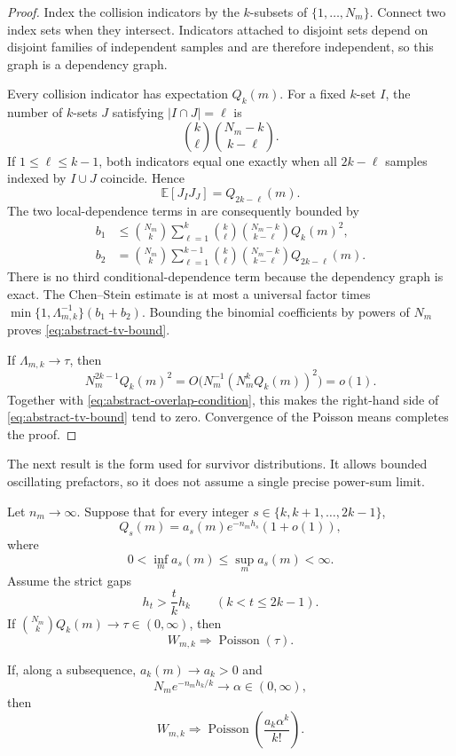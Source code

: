 \begin{proof}
Index the collision indicators by the \(k\)-subsets of
\(\{1,\ldots,N_m\}\).  Connect two index sets when they intersect.
Indicators attached to disjoint sets depend on disjoint families of
independent samples and are therefore independent, so this graph is a
dependency graph.

Every collision indicator has expectation \(Q_k(m)\).  For a fixed
\(k\)-set \(I\), the number of \(k\)-sets \(J\) satisfying
\(|I\cap J|=\ell\) is
\[
  \binom{k}{\ell}\binom{N_m-k}{k-\ell}.
\]
If \(1\leq\ell\leq k-1\), both indicators equal one exactly when all
\(2k-\ell\) samples indexed by \(I\cup J\) coincide.  Hence
\[
  \mathbb E[J_IJ_J]=Q_{2k-\ell}(m).
\]
The two local-dependence terms in
\citet[Theorem~1]{ArratiaGoldsteinGordon1989} are consequently bounded
by
\begin{align*}
 b_1
 &\leq\binom{N_m}{k}
   \sum_{\ell=1}^k
   \binom{k}{\ell}\binom{N_m-k}{k-\ell}Q_k(m)^2,\\
 b_2
 &=\binom{N_m}{k}
   \sum_{\ell=1}^{k-1}
   \binom{k}{\ell}\binom{N_m-k}{k-\ell}
   Q_{2k-\ell}(m).
\end{align*}
There is no third conditional-dependence term because the dependency
graph is exact.  The Chen--Stein estimate is at most a universal factor
times \(\min\{1,\Lambda_{m,k}^{-1}\}(b_1+b_2)\).  Bounding the
binomial coefficients by powers of \(N_m\) proves
\eqref{eq:abstract-tv-bound}.

If \(\Lambda_{m,k}\to\tau\), then
\[
  N_m^{2k-1}Q_k(m)^2
  =O\bigl(N_m^{-1}(N_m^kQ_k(m))^2\bigr)=o(1).
\]
Together with \eqref{eq:abstract-overlap-condition}, this makes the
right-hand side of \eqref{eq:abstract-tv-bound} tend to zero.
Convergence of the Poisson means completes the proof.
\end{proof}

The next result is the form used for survivor distributions.  It allows
bounded oscillating prefactors, so it does not assume a single precise
power-sum limit.

\begin{corollary}
\label{cor:abstract-exponential-criterion}
Let \(n_m\to\infty\).  Suppose that for every integer
\(s\in\{k,k+1,\ldots,2k-1\}\),
\begin{equation}
  Q_s(m)=a_s(m)e^{-n_mh_s}(1+o(1)),
  \label{eq:abstract-power-asymptotic}
\end{equation}
where
\[
  0<\inf_m a_s(m)\leq\sup_m a_s(m)<\infty.
\]
Assume the strict gaps
\begin{equation}
  h_t>\frac{t}{k}h_k
  \qquad(k<t\leq2k-1).
  \label{eq:abstract-strict-gaps}
\end{equation}
If \(\binom{N_m}{k}Q_k(m)\to\tau\in(0,\infty)\), then
\[
  W_{m,k}\Rightarrow\operatorname{Poisson}(\tau).
\]

If, along a subsequence, \(a_k(m)\to a_k>0\) and
\[
  N_me^{-n_mh_k/k}\longrightarrow\alpha\in(0,\infty),
\]
then
\[
  W_{m,k}\Rightarrow
  \operatorname{Poisson}\!\left(\frac{a_k\alpha^k}{k!}\right).
\]
\end{corollary}

